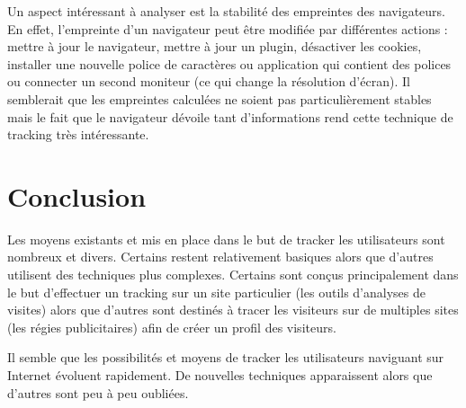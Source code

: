 Un aspect intéressant à analyser est la stabilité des empreintes des navigateurs. En effet, l'empreinte d'un navigateur peut être modifiée par différentes actions : mettre à jour le navigateur, mettre à jour un plugin, désactiver les cookies, installer une nouvelle police de caractères ou application qui contient des polices ou connecter un second moniteur (ce qui change la résolution d'écran). Il semblerait que les empreintes calculées ne soient pas particulièrement stables mais le fait que le navigateur dévoile tant d'informations rend cette technique de tracking très intéressante. \cite{Eckersley:2010:UYW:1881151.1881152}

\section{Conclusion}
Les moyens existants et mis en place dans le but de tracker les utilisateurs sont nombreux et divers. Certains restent relativement basiques alors que d'autres utilisent des techniques plus complexes. Certains sont conçus principalement dans le but d'effectuer un tracking sur un site particulier (les outils d'analyses de visites) alors que d'autres sont destinés à tracer les visiteurs sur de multiples sites (les régies publicitaires) afin de créer un profil des visiteurs.

Il semble que les possibilités et moyens de tracker les utilisateurs naviguant sur Internet évoluent rapidement. De nouvelles techniques apparaissent alors que d'autres sont peu à peu oubliées.

